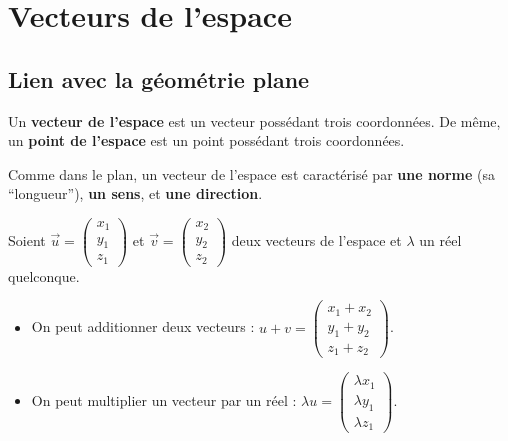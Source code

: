 



	\section{Vecteurs de l'espace}
	
	\subsection{Lien avec la géométrie plane}
	
	\begin{formula}[Définition]
		Un \textbf{vecteur de l'espace} est un vecteur possédant trois coordonnées. De même, un \textbf{point de l'espace} est un point possédant trois coordonnées.
	\end{formula}
	
	Comme dans le plan, un vecteur de l'espace est caractérisé par \textbf{une norme} (sa ``longueur''), \textbf{un sens}, et \textbf{une direction}.
	
	\begin{formula}
		Soient $\overrightarrow{u} = \begin{pmatrix} x_1 \\ y_1 \\ z_1 \end{pmatrix}$ et $\overrightarrow{v} = \begin{pmatrix} x_2 \\ y_2 \\ z_2 \end{pmatrix}$ deux vecteurs de l'espace et $\lambda$ un réel quelconque.
		\begin{itemize}
			\item On peut additionner deux vecteurs : $u + v = \begin{pmatrix} x_1 + x_2 \\ y_1 + y_2 \\ z_1 + z_2 \end{pmatrix}$.
			\item On peut multiplier un vecteur par un réel : $\lambda u =  \begin{pmatrix} \lambda x_1 \\ \lambda y_1 \\ \lambda z_1 \end{pmatrix}$.
		\end{itemize}
	\end{formula}
	
